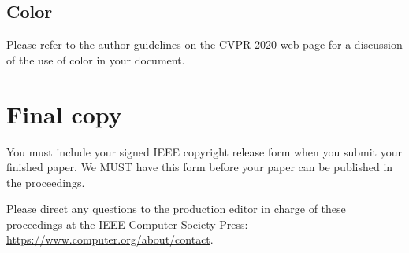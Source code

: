\documentclass[10pt,twocolumn,letterpaper]{article}
\begin{document}
\subsection{Color}

Please refer to the author guidelines on the CVPR 2020 web page for a discussion
of the use of color in your document.

\section{Final copy}

You must include your signed IEEE copyright release form when you submit
your finished paper. We MUST have this form before your paper can be
published in the proceedings.

Please direct any questions to the production editor in charge of these 
proceedings at the IEEE Computer Society Press: 
\url{https://www.computer.org/about/contact}. 


{\small


}
\end{document}
